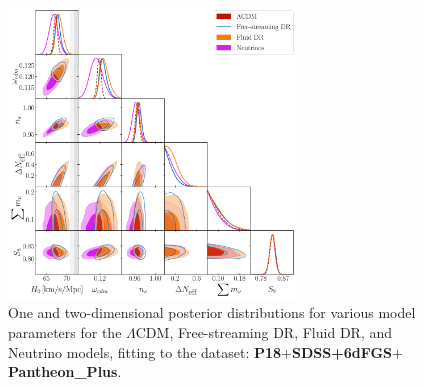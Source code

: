 \documentclass[aps,prd,twocolumn,notitlepage,
superscriptaddress,
nofootinbib,floatfix]{revtex4-2}
\newcommand{\planck}{\textbf{P18}}
\newcommand{\boss}{$\mathbf{+}$\textbf{SDSS+6dFGS}}
\newcommand{\pantheon}{$\mathbf{+}${\bf Pantheon\_Plus}}
\begin{document}
\begin{widetext}
\begin{figure}[H]
\centering
    \includegraphics[width=0.68\textwidth]{figures_21_4/all_bPp.pdf}
    \caption{One and two-dimensional posterior distributions for various model parameters for the $\Lambda$CDM, Free-streaming DR, Fluid DR, and Neutrino models, fitting to the dataset: \planck\boss\pantheon.}
\end{figure}


\end{widetext}
\end{document}
